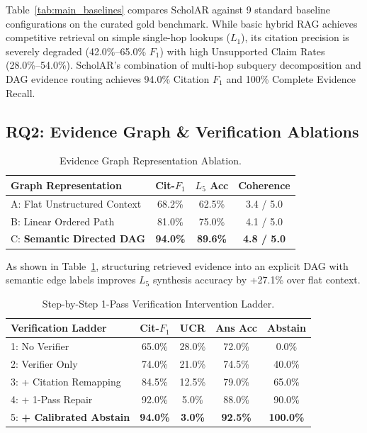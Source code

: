 \documentclass[11pt,a4paper]{article}
\begin{document}
Table~\ref{tab:main_baselines} compares ScholAR against 9 standard baseline configurations on the curated gold benchmark. While basic hybrid RAG achieves competitive retrieval on simple single-hop lookups ($L_1$), its citation precision is severely degraded (42.0\%--65.0\% $F_1$) with high Unsupported Claim Rates (28.0\%--54.0\%). ScholAR's combination of multi-hop subquery decomposition and DAG evidence routing achieves 94.0\% Citation $F_1$ and 100\% Complete Evidence Recall.

\subsection{RQ2: Evidence Graph & Verification Ablations}

\begin{table}[t]
\centering
\small
\begin{tabular}{lccc}
\toprule
\textbf{Graph Representation} & \textbf{Cit-$F_1$} & \textbf{$L_5$ Acc} & \textbf{Coherence} \\
\midrule
A: Flat Unstructured Context & 68.2\% & 62.5\% & 3.4 / 5.0 \\
B: Linear Ordered Path & 81.0\% & 75.0\% & 4.1 / 5.0 \\
C: \textbf{Semantic Directed DAG} & \textbf{94.0\%} & \textbf{89.6\%} & \textbf{4.8 / 5.0} \\
\bottomrule
\end{tabular}
\caption{Evidence Graph Representation Ablation.}
\label{tab:graph_ablation}
\end{table}

As shown in Table~\ref{tab:graph_ablation}, structuring retrieved evidence into an explicit DAG with semantic edge labels improves $L_5$ synthesis accuracy by +27.1\% over flat context. 

\begin{table}[t]
\centering
\small
\begin{tabular}{lcccc}
\toprule
\textbf{Verification Ladder} & \textbf{Cit-$F_1$} & \textbf{UCR} & \textbf{Ans Acc} & \textbf{Abstain} \\
\midrule
1: No Verifier & 65.0\% & 28.0\% & 72.0\% & 0.0\% \\
2: Verifier Only & 74.0\% & 21.0\% & 74.5\% & 40.0\% \\
3: + Citation Remapping & 84.5\% & 12.5\% & 79.0\% & 65.0\% \\
4: + 1-Pass Repair & 92.0\% & 5.0\% & 88.0\% & 90.0\% \\
5: \textbf{+ Calibrated Abstain} & \textbf{94.0\%} & \textbf{3.0\%} & \textbf{92.5\%} & \textbf{100.0\%} \\
\bottomrule
\end{tabular}
\caption{Step-by-Step 1-Pass Verification Intervention Ladder.}
\label{tab:verifier_ladder}
\end{table}
\end{document}
